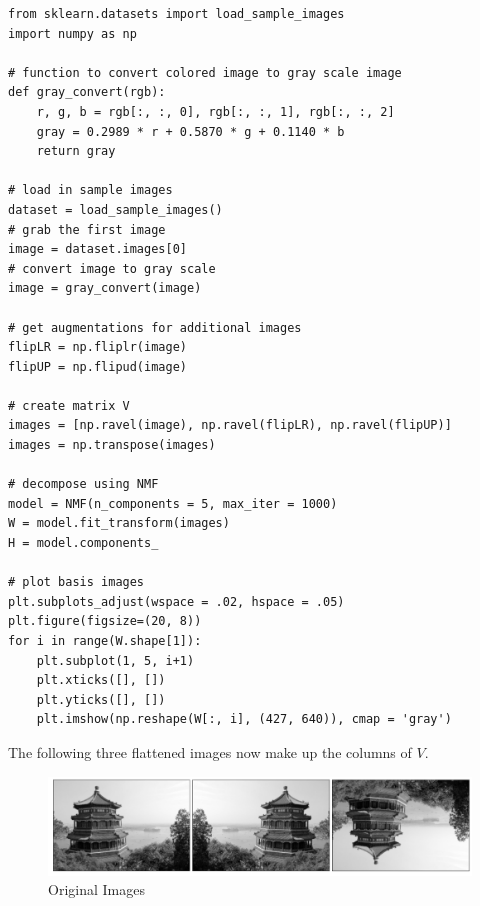 \begin{lstlisting}
from sklearn.datasets import load_sample_images
import numpy as np

# function to convert colored image to gray scale image
def gray_convert(rgb):
    r, g, b = rgb[:, :, 0], rgb[:, :, 1], rgb[:, :, 2]
    gray = 0.2989 * r + 0.5870 * g + 0.1140 * b
    return gray

# load in sample images
dataset = load_sample_images()
# grab the first image
image = dataset.images[0]
# convert image to gray scale
image = gray_convert(image)

# get augmentations for additional images
flipLR = np.fliplr(image)
flipUP = np.flipud(image)

# create matrix V
images = [np.ravel(image), np.ravel(flipLR), np.ravel(flipUP)]
images = np.transpose(images)

# decompose using NMF
model = NMF(n_components = 5, max_iter = 1000)
W = model.fit_transform(images)
H = model.components_

# plot basis images
plt.subplots_adjust(wspace = .02, hspace = .05)
plt.figure(figsize=(20, 8))
for i in range(W.shape[1]):
    plt.subplot(1, 5, i+1)
    plt.xticks([], [])
    plt.yticks([], [])
    plt.imshow(np.reshape(W[:, i], (427, 640)), cmap = 'gray')

\end{lstlisting}


The following three flattened images now make up the columns of $V$.

\begin{figure}[H]
\centering
\includegraphics[width=\textwidth]{figures/building_images.pdf}
\caption{Original Images}
\label{fig:basis_faces1}
\end{figure}

